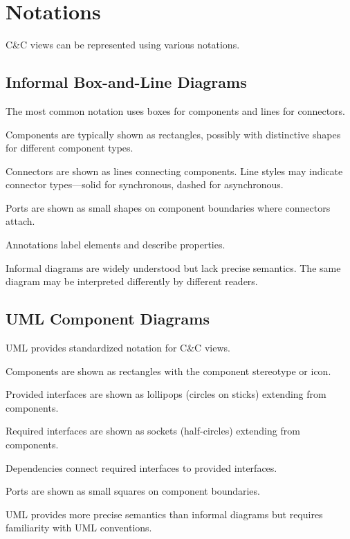 \documentclass[11pt]{article}
\begin{document}
\section{Notations}

C\&C views can be represented using various notations.

\subsection{Informal Box-and-Line Diagrams}

The most common notation uses boxes for components and lines for connectors.

Components are typically shown as rectangles, possibly with distinctive shapes for different component types.

Connectors are shown as lines connecting components. Line styles may indicate connector types---solid for synchronous, dashed for asynchronous.

Ports are shown as small shapes on component boundaries where connectors attach.

Annotations label elements and describe properties.

Informal diagrams are widely understood but lack precise semantics. The same diagram may be interpreted differently by different readers.

\subsection{UML Component Diagrams}

UML provides standardized notation for C\&C views.

Components are shown as rectangles with the component stereotype or icon.

Provided interfaces are shown as lollipops (circles on sticks) extending from components.

Required interfaces are shown as sockets (half-circles) extending from components.

Dependencies connect required interfaces to provided interfaces.

Ports are shown as small squares on component boundaries.

UML provides more precise semantics than informal diagrams but requires familiarity with UML conventions.
\end{document}
